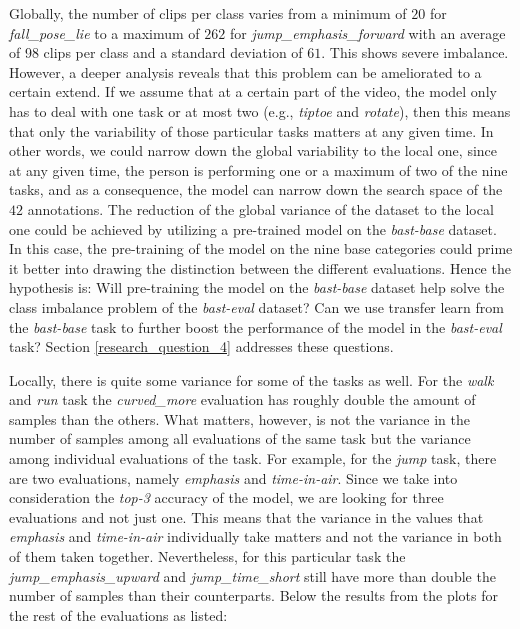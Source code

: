 \documentclass[extern,palatino]{cgMA}
\begin{document}
\noindent Globally, the number of clips per class varies from a minimum of $20$ for \textit{fall\_pose\_lie} to a maximum of $262$ for \textit{jump\_emphasis\_forward} with an average of 98 clips per class and a standard deviation of $61$. This shows severe imbalance. However, a deeper analysis reveals that this problem can be ameliorated to a certain extend. If we assume that at a certain part of the video, the model only has to deal with one task or at most two (e.g., \textit{tiptoe} and \textit{rotate}), then this means that only the variability of those particular tasks matters at any given time. In other words, we could narrow down the global variability to the local one, since at any given time, the person is performing one or a maximum of two of the nine tasks, and as a consequence, the model can narrow down the search space of the $42$ annotations. The reduction of the global variance of the dataset to the local one could be achieved by utilizing a pre-trained model on the \textit{bast-base} dataset. In this case, the pre-training of the model on the nine base categories could prime it better into drawing the distinction between the different evaluations.  Hence the hypothesis is: Will pre-training the model on the \textit{bast-base} dataset help solve the class imbalance problem of the \textit{bast-eval} dataset? Can we use transfer learn from the \textit{bast-base} task to further boost the performance of the model in the \textit{bast-eval} task? Section \ref{research_question_4} addresses these questions.

Locally, there is quite some variance for some of the tasks as well. For the \textit{walk} and \textit{run} task the \textit{curved\_more} evaluation has roughly double the amount of samples than the others. What matters, however, is not the variance in the number of samples among all evaluations of the same task but the variance among individual evaluations of the task. For example, for the \textit{jump} task, there are two evaluations, namely \textit{emphasis} and \textit{time-in-air}. Since we take into consideration the \textit{top-3} accuracy of the model, we are looking for three evaluations and not just one. This means that the variance in the values that \textit{emphasis} and \textit{time-in-air} individually take matters and not the variance in both of them taken together. Nevertheless, for this particular task the \textit{jump\_emphasis\_upward} and \textit{jump\_time\_short} still have more than double the number of samples than their counterparts. Below the results from the plots for the rest of the evaluations as listed:
\end{document}
